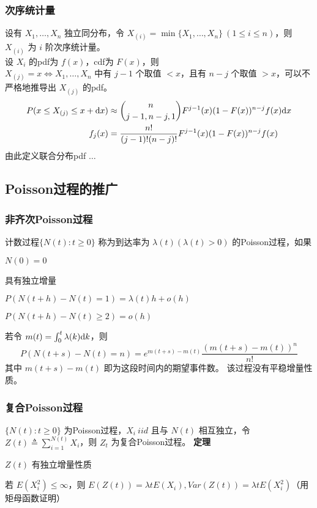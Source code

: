 \documentclass[./main.tex]{subfiles}
\begin{document}
\subsubsection{次序统计量}
设有 $X_1,\dots,X_n$ 独立同分布，令 $X_{(i)}=\min\{X_1,\dots,X_n\}\ (1\le i\le n)$，则 $X_{(i)}$ 为 $i$ 阶次序统计量。\\
\indent 设 $X_i$ 的pdf为 $f(x)$，cdf为 $F(x)$，则\\
\indent $X_{(j)}=x\iff X_1,\dots,X_n$ 中有 $j-1$ 个取值 $<x$，且有 $n-j$ 个取值 $>x$，可以不严格地推导出 $X_{(j)}$ 的pdf。
\begin{align}
    P(x\le X_{(j)}\le x+\text{d}x) & \approx\binom{n}{j-1,n-j,1}F^{j-1}(x)(1-F(x))^{n-j}f(x)\text{d}x\notag \\
    f_j(x)                     & =\frac{n!}{(j-1)!(n-j)!}F^{j-1}(x)(1-F(x))^{n-j}f(x)
\end{align}
由此定义联合分布pdf $\dots$

\subsection{Poisson过程的推广}
\subsubsection{非齐次Poisson过程}
计数过程$\{N(t):t\ge 0\}$ 称为到达率为 $\lambda(t)(\lambda(t)>0)$ 的Poisson过程，如果
\begin{enumerate*}
    \item $N(0)=0$
    \item 具有独立增量
    \item $P(N(t+h)-N(t)=1)=\lambda(t)h+o(h)$
    \item $P(N(t+h)-N(t)\ge 2)=o(h)$
\end{enumerate*}
若令 $m(t)=\int_0^t\lambda(k)\text{d}k$，则 $$P(N(t+s)-N(t)=n)=e^{m(t+s)-m(t)}\frac{(m(t+s)-m(t))^n}{n!}$$ 其中 $m(t+s)-m(t)$ 即为这段时间内的期望事件数。
该过程没有平稳增量性质。
\subsubsection{复合Poisson过程}
$\{N(t):t\ge 0\}$ 为Poisson过程，$X_i\ iid$ 且与 $N(t)$ 相互独立，令$Z(t)\triangleq\sum_{i=1}^{N(t)}X_i$，则 $Z_t$ 为复合Poisson过程。
\noindent\textbf{定理}
\begin{enumerate*}
    \item $Z(t)$ 有独立增量性质
    \item 若 $E(X_i^2)\le\infty$，则 $E(Z(t))=\lambda tE(X_i),Var(Z(t))=\lambda tE(X_i^2)$（用矩母函数证明）
\end{enumerate*}
\end{document}
